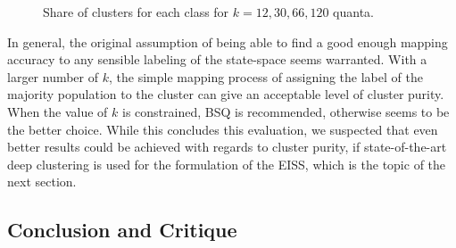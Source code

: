 			\begin{figure}[ht]
				\centering
				\caption[Cluster shares in the EMA evaluation]{Share of clusters for each class for $k=12, 30, 66, 120$ quanta.}
				\label{fig:purity_classwise}
			\end{figure}
			
			In general, the original assumption of being able to find a good enough mapping accuracy to any sensible labeling of the state-space seems warranted.
			With a larger number of $k$, the simple mapping process of assigning the label of the majority population to the cluster can give an acceptable level of cluster purity.
			When the value of $k$ is constrained, \ac{BSQ} is recommended, otherwise \kmeans{} seems to be the better choice.			
			While this concludes this evaluation, we suspected that even better results could be achieved with regards to cluster purity, if state-of-the-art deep clustering is used for the formulation of the \ac{EISS}, which is the topic of the next section.
			
		\subsection{Conclusion and Critique}
						
